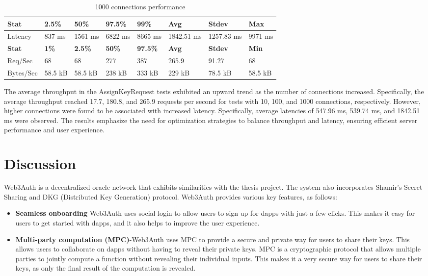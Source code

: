\documentclass[../Main.tex]{subfiles}
\begin{document}
\begin{table}[H]
  \centering
  \begin{tabular}{|l|l|l|l|l|l|l|l|}
\hline
\rowcolor[HTML]{f56b00}
\textbf{Stat} & \textbf{2.5\%} & \textbf{50\%} & \textbf{97.5\%} & \textbf{99\%} & \textbf{Avg} & \textbf{Stdev} & \textbf{Max} \\
\hline
Latency & 837 ms & 1561 ms & 6822 ms & 8665 ms & 1842.51 ms & 1257.83 ms & 9971 ms \\
\hline
\rowcolor[HTML]{f56b00}
\textbf{Stat} & \textbf{1\%} & \textbf{2.5\%} & \textbf{50\%} & \textbf{97.5\%} & \textbf{Avg} & \textbf{Stdev} & \textbf{Min} \\
\hline
Req/Sec & 68 & 68 & 277 & 387 & 265.9 & 91.27 & 68 \\
Bytes/Sec & 58.5 kB & 58.5 kB & 238 kB & 333 kB & 229 kB & 78.5 kB & 58.5 kB \\
\hline
\end{tabular}
 \caption{1000 connections performance}
 \label{1000-connections-performance}
\end{table}

\indent The average throughput in the AssignKeyRequest tests exhibited an upward trend as the number of connections increased. Specifically, the average throughput reached 17.7, 180.8, and 265.9 requests per second for tests with 10, 100, and 1000 connections, respectively. However, higher connections were found to be associated with increased latency. Specifically, average latencies of 547.96 ms, 539.74 ms, and 1842.51 ms were observed. The results emphasize the need for optimization strategies to balance throughput and latency, ensuring efficient server performance and user experience.

\section{Discussion}
Web3Auth is a decentralized oracle network that exhibits similarities with the thesis project. The system also incorporates Shamir's Secret Sharing and DKG (Distributed Key Generation) protocol. Web3Auth provides various key features, as follows:
\begin{itemize}
  \item \textbf{Seamless onboarding}-Web3Auth uses social login to allow users to sign up for dapps with just a few clicks. This makes it easy for users to get started with dapps, and it also helps to improve the user experience.
  \item \textbf{Multi-party computation (MPC)}-Web3Auth uses MPC to provide a secure and private way for users to share their keys. This allows users to collaborate on dapps without having to reveal their private keys. MPC is a cryptographic protocol that allows multiple parties to jointly compute a function without revealing their individual inputs. This makes it a very secure way for users to share their keys, as only the final result of the computation is revealed.

\end{itemize}
\end{document}
